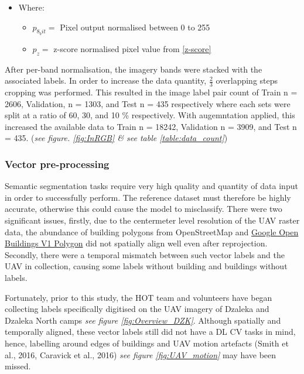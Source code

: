 \documentclass[11pt, a4paper, twoside]{report}
\begin{document}
\begin{itemize}
  \item Where:
    \begin{itemize}
      \item $p_{8_bit} =$ Pixel output normalised between 0 to 255
      \item $p_{z} =$ z-score normalised pixel value from \ref{z-score}
    \end{itemize}
\end{itemize}

After per-band normalisation, the imagery bands were stacked with the associated labels. In order to increase the data quantity, $\frac{2}{3}$ overlapping steps cropping was performed. This resulted in the image label pair count of Train n = 2606, Validation, n = 1303, and Test n = 435 respectively where each sets were split at a ratio of 60, 30, and 10 \% respectively. With augemntation applied, this increased the available data to Train n = 18242, Validation n = 3909, and Test n = 435. (\textit{see figure. \ref{fig:InRGB} \& see table \ref{table:data_count}})\\\par

\subsubsection{Vector pre-processing}

Semantic segmentation tasks require very high quality and quantity of data input in order to successfully perform. The reference dataset must therefore be highly accurate, otherwise this could cause the model to misclassify. There were two significant issues, firstly, due to the centermeter level resolution of the UAV raster data, the abundance of building polygons from OpenStreetMap and \href{https://developers.google.com/earth-engine/datasets/catalog/GOOGLE_Research_open-buildings_v1_polygons}{Google Open Buildings V1 Polygon} did not spatially align well even after reprojection. Secondly, there were a temporal mismatch between such vector labels and the UAV in collection, causing some labels without building and buildings without labels.\\\par

Fortunately, prior to this study, the HOT team and volunteers have began collecting labels specifically digitised on the UAV imagery of Dzaleka and Dzaleka North camps \textit{see figure \ref{fig:Overview_DZK}}. Although spatially and temporally aligned, these vector labels still did not have a DL CV tasks in mind, hence, labelling around edges of buildings and UAV motion artefacts (Smith et al., 2016, Caravick et al., 2016) \textit{see figure \ref{fig:UAV_motion}} may have been missed.\\\par
\end{document}
